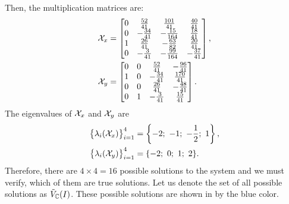 \begin{example}
  Then, the multiplication matrices are:
  \begin{align}
    \mathcal{X}_x &= \begin{bmatrix} 0 & \frac{52}{41} & \frac{101}{41} & \frac{40}{41}\\
                  0 & -\frac{34}{41} & -\frac{15}{164} & \frac{18}{41}\\
                  1 & \frac{26}{41} & -\frac{63}{82} & \frac{20}{41}\\
                  0 & -\frac{3}{41} & -\frac{99}{164} & -\frac{37}{41}\end{bmatrix},\\
    \mathcal{X}_y &= \begin{bmatrix} 0 & 0 & \frac{52}{41} & -\frac{96}{41}\\
                  1 & 0 & -\frac{34}{41} & \frac{170}{41}\\
                  0 & 0 & \frac{26}{41} & -\frac{48}{41}\\
                  0 & 1 & -\frac{3}{41} & \frac{15}{41}\end{bmatrix}.
  \end{align}
  The eigenvalues of $\mathcal{X}_x$ and $\mathcal{X}_y$ are
  \begin{align}
    \big\{\lambda_i(\MM_x)\big\}_{i=1}^4 &= \left\{-2;\ -1;\ -\frac{1}{2};\ 1\right\},\\
    \big\{\lambda_i(\MM_y)\big\}_{i=1}^4 &= \{-2;\ 0;\ 1;\ 2\}.
  \end{align}
  Therefore, there are $4\times4=16$ possible solutions to the system and we must verify, which of them are true solutions.
  Let us denote the set of all possible solutions as $\tilde{V}_{\mathbb{C}}(I)$.
  These possible solutions are shown in  by the blue color.


\end{example}
